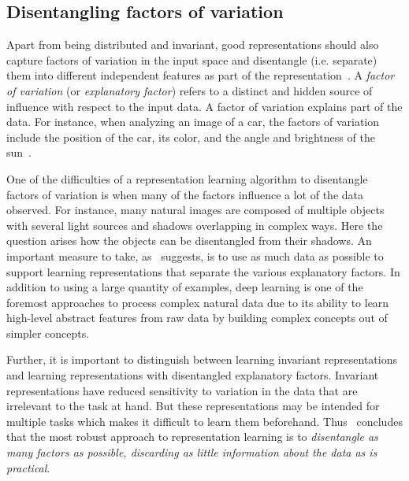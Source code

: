 \documentclass[12pt,a4paper]{article}
\begin{document}
\subsection{Disentangling factors of variation}\label{subsec:unsupDFoV}
Apart from being distributed and invariant, good representations should also capture factors of variation in the input space and disentangle (i.e. separate) them into different independent features as part of the representation~\cite{ReprLearning}. A \textit{factor of variation} (or \textit{explanatory factor}) refers to a distinct and hidden source of influence with respect to the input data. A factor of variation explains part of the data. For instance, when analyzing an image of a car, the factors of variation include the position of the car, its color, and the angle and brightness of the sun~\cite{DeepLearningBook}.

One of the difficulties of a representation learning algorithm to disentangle factors of variation is when many of the factors influence a lot of the data observed. For instance, many natural images are composed of multiple objects with several light sources and shadows overlapping in complex ways. Here the question arises how the objects can be disentangled from their shadows. An important measure to take, as~\cite{ReprLearning} suggests, is to use as much data as possible to support learning representations that separate the various explanatory factors. In addition to using a large quantity of examples, deep learning is one of the foremost approaches to process complex natural data due to its ability to learn high-level abstract features from raw data by building complex concepts out of simpler concepts. 

Further, it is important to distinguish between learning invariant representations and learning representations with disentangled explanatory factors. Invariant representations have reduced sensitivity to variation in the data that are irrelevant to the task at hand. But these representations may be intended for multiple tasks which makes it difficult to learn them beforehand. Thus~\cite{ReprLearning} concludes that the most robust approach to representation learning is to \textit{disentangle as many factors as possible, discarding as little information about the data as is practical}.
\end{document}
